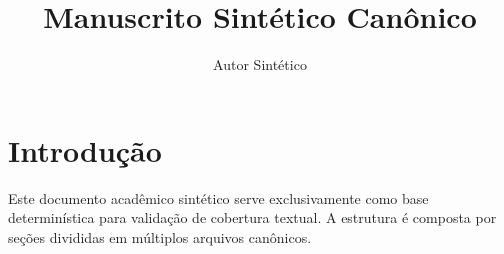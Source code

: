 \documentclass{article}
\title{Manuscrito Sintético Canônico}
\author{Autor Sintético}
\begin{document}
\maketitle

\section{Introdução}
Este documento acadêmico sintético serve exclusivamente como base determinística para validação de cobertura textual.
A estrutura é composta por seções divididas em múltiplos arquivos canônicos.



\end{document}
